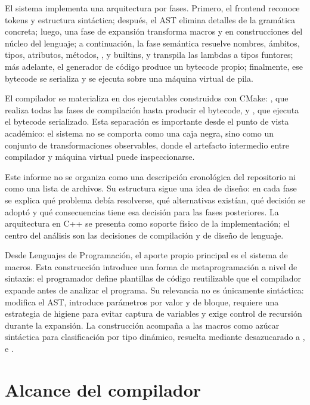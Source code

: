\documentclass[12pt,letterpaper]{article}
\newcommand{\repo}[1]{\texttt{\detokenize{#1}}}
\begin{document}
El sistema implementa una arquitectura por fases. Primero, el frontend reconoce
tokens y estructura sintáctica; después, el AST elimina detalles de la gramática
concreta; luego, una fase de expansión transforma macros y \repo{match} en
construcciones del núcleo del lenguaje; a continuación, la fase semántica
resuelve nombres, ámbitos, tipos, atributos, métodos, \repo{self}, \repo{base} y
builtins, y transpila las lambdas a tipos funtores; más adelante, el generador de
código produce un bytecode propio; finalmente, ese bytecode se serializa y se
ejecuta sobre una máquina virtual de pila.

El compilador se materializa en dos ejecutables construidos con CMake:
\repo{hulk}, que realiza todas las fases de compilación hasta producir el
bytecode, y \repo{hulk-vm}, que ejecuta el bytecode serializado. Esta separación
es importante desde el punto de vista académico: el sistema no se comporta como
una caja negra, sino como un conjunto de transformaciones observables, donde el
artefacto intermedio entre compilador y máquina virtual puede inspeccionarse.

Este informe no se organiza como una descripción cronológica del repositorio ni
como una lista de archivos. Su estructura sigue una idea de diseño: en cada fase
se explica qué problema debía resolverse, qué alternativas existían, qué decisión
se adoptó y qué consecuencias tiene esa decisión para las fases posteriores. La
arquitectura en C++ se presenta como soporte físico de la implementación; el
centro del análisis son las decisiones de compilación y de diseño de lenguaje.

Desde Lenguajes de Programación, el aporte propio principal es el sistema de
macros. Esta construcción introduce una forma de metaprogramación a nivel de
sintaxis: el programador define plantillas de código reutilizable que el
compilador expande antes de analizar el programa. Su relevancia no es únicamente
sintáctica: modifica el AST, introduce parámetros por valor y de bloque, requiere
una estrategia de higiene para evitar captura de variables y exige control de
recursión durante la expansión. La construcción \repo{match} acompaña a las
macros como azúcar sintáctica para clasificación por tipo dinámico, resuelta
mediante desazucarado a \repo{let}, \repo{if} e \repo{is}.

\section{Alcance del compilador}
\end{document}
